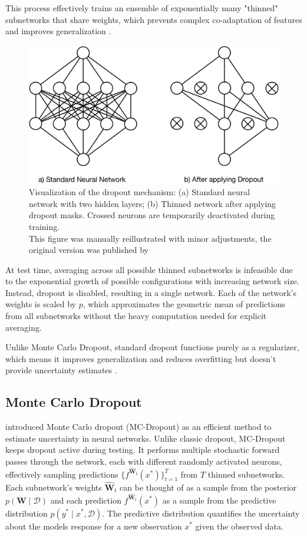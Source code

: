 This process effectively trains an ensemble of exponentially many "thinned" subnetworks that share
weights, which prevents complex co-adaptation of features and improves generalization \citep{srivastava2014dropout}.

\begin{figure}[htbp]
    \centering
    \includegraphics[width=0.65\linewidth]{figures/fig_dropout.png}
    \caption{Visualization of the dropout mechanism: (a) Standard neural network with two hidden layers; (b) Thinned network after applying dropout masks. Crossed neurons are temporarily deactivated during training.\\
    This figure was manually reillustrated with minor adjustments, the original version was published by \citet{srivastava2014dropout}}
    \label{fig:dropout-srivastava}
\end{figure}

At test time, averaging across all possible thinned subnetworks is infeasible due to the exponential
growth of possible configurations with increasing network size. Instead, dropout is disabled, resulting
in a single network. Each of the network's weights is scaled by $p$, which approximates the geometric
mean of predictions from all subnetworks without the heavy computation needed for explicit averaging.

\vspace{0.15cm}
Unlike Monte Carlo Dropout, standard dropout functions purely as a regularizer, which means it
improves generalization and reduces overfitting but doesn't provide uncertainty estimates
\citep{srivastava2014dropout}.


\subsection{Monte Carlo Dropout}
\label{methodology:mcd}
\citet{gal2016mcdropout} introduced Monte Carlo dropout (MC-Dropout) as an efficient method to estimate
uncertainty in neural networks. Unlike classic dropout, MC-Dropout keeps dropout active during testing.
It performs multiple stochastic forward passes through the network, each with different randomly
activated neurons, effectively sampling predictions $\{f^{\hat{\mathbf{W}}_t}(x^*)\}_{t=1}^T$ from $T$
thinned subnetworks. Each subnetwork's weights $\hat{\mathbf{W}}_t$ can be thought of as a sample from
the posterior $p(\mathbf{W} \mid \mathcal{D})$ and each prediction $f^{\hat{\mathbf{W}}_t}(x^*)$ as a
sample from the predictive distribution $p(y^* \mid x^*, \mathcal{D})$. The predictive distribution
quantifies the uncertainty about the models response for a new observation $x^*$ given the observed data.

